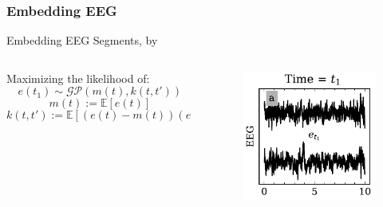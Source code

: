 \documentclass[t]{beamer}
\theoremstyle{definition}
\def\baselineskip{}%
\begin{document}
\subsubsection{Embedding EEG}

\begin{frame}{Embedding EEG Segments, by}

\begin{columns}[T] %
    
    \begin{column}{0.618\textwidth} %

    \begin{block}{Maximizing the likelihood of:}
        $$e(t_1) \sim \mathcal{GP}(m(t), k(t, t'))$$
        $$m(t) := \mathbb{E}[e(t)]$$
        $$k(t, t') := \mathbb{E}[(e(t) - m(t))(e(t') - m(t'))]$$
    \end{block}
    
    \end{column}
    
    \begin{column}{0.382\textwidth} %
    \vspace{-\baselineskip}
    \begin{figure}
        \centering
        \includegraphics[width=\textwidth]{figs/eeg_sample.pdf}
        \label{fig:my_label}
    \end{figure}
    

\end{column}
\end{columns}
\end{frame}
\end{document}
